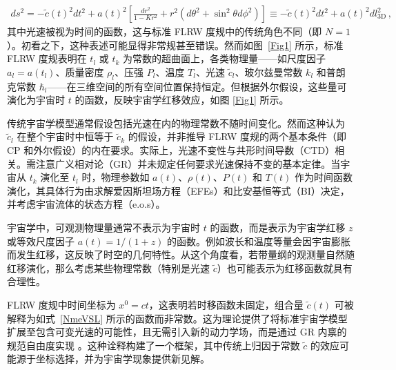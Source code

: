\documentclass[jkps,preprint,fleqn]{revtex4}
\newcommand{\tc}{\tilde{c}}
\begin{document}
\begin{CJK*}{UTF8}{gbsn}
\begin{align}
ds^2 = - \tc(t)^2 dt^2 + a(t)^2 \left[ \frac{dr^2}{1-Kr^2} + r^2  \left( d \theta^2 + \sin^2 \theta d \phi^2 \right)  \right] \equiv - \tc(t)^2 dt^2 + a(t)^2 dl_{3\textrm{D}}^2 \label{dstgen} \,,
\end{align}
其中光速被视为时间的函数，这与标准 FLRW 度规中的传统角色不同（即 $N = 1$）。初看之下，这种表述可能显得非常规甚至错误。然而如图~\ref{Fig1} 所示，标准 FLRW 度规表明在 $t_l$ 或 $t_k$ 为常数的超曲面上，各类物理量——如尺度因子 $a_l = a(t_l)$、质量密度 $\rho_l$、压强 $P_l$、温度 $T_l$、光速 $\tc_l$、玻尔兹曼常数 $k_l$ 和普朗克常数 $\hbar_l$——在三维空间的所有空间位置保持恒定。但根据外尔假设，这些量可演化为宇宙时 $t$ 的函数，反映宇宙学红移效应，如图 \ref{Fig1} 所示。

传统宇宙学模型通常假设包括光速在内的物理常数不随时间变化。然而这种认为 $\tc_l$ 在整个宇宙时中恒等于 $\tc_k$ 的假设，并非推导 FLRW 度规的两个基本条件（即 CP 和外尔假设）的内在要求。实际上，光速不变性与共形时间导数（CTD）相关。需注意广义相对论（GR）并未规定任何要求光速保持不变的基本定律。当宇宙从 $t_k$ 演化至 $t_l$ 时，物理参数如 $a(t)$、$\rho(t)$、$P(t)$ 和 $T(t)$ 作为时间函数演化，其具体行为由求解爱因斯坦场方程（EFEs）和比安基恒等式（BI）决定，并考虑宇宙流体的状态方程（e.o.s）。

宇宙学中，可观测物理量通常不表示为宇宙时 $t$ 的函数，而是表示为宇宙学红移 $z$ 或等效尺度因子 $a(t) = 1/(1+z)$ 的函数。例如波长和温度等量会因宇宙膨胀而发生红移，这反映了时空的几何特性。从这个角度看，若带量纲的观测量自然随红移演化，那么考虑某些物理常数（特别是光速 $\tc$）也可能表示为红移函数就具有合理性。

FLRW 度规中时间坐标为 $x^0 = ct$，这表明若时移函数未固定，组合量 $\tc(t)$ 可被解释为如式~\eqref{NmeVSL} 所示的函数而非常数。这为理论提供了将标准宇宙学模型扩展至包含可变光速的可能性，且无需引入新的动力学场，而是通过 GR 内禀的规范自由度实现 \cite{Lee:2024zcu}。这种诠释构建了一个框架，其中传统上归因于常数 $\tc$ 的效应可能源于坐标选择，并为宇宙学现象提供新见解。


\end{CJK*}
\end{document}
